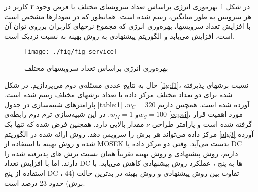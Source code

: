 در شکل \ref{fig:f1a3}
بهره‌وری انرژی براساس تعداد سرویسای مختلف با فرض وجود ۲ کاربر در هر سرویس به طور میانگین، رسم شده است. همانطور که در نمودارها مشخص است با افزایش تعداد سرویسها، بهره‌وری انرژی که مجموع نرخهای کاربران برروی توان آن است، افزایش می‌یابد و الگوریتم پیشنهادی به روش بهینه به نسبت نزدیک است‌.  
\begin{figure}%
	\centering
	\texttt{[image: ./fig/fig\_service]}
	\caption{بهره‌وری انرژی براساس تعداد سرویسهای مختلف }
	\label{fig:f1a3}
\end{figure}


حال به نتایج عددی مسئله‌ی دوم می‌پردازیم.
در شکل \ref{fig:f1}، نسبت برشهای پذیرفته شده برای دو تعداد مختلف مرکز داده با تعداد برشهای مختلف رسم شده است. پارامترهای شبیه‌سازی در جدول \ref{table:1} آورده شده است. همچنین داریم 
 $w_C = 320$،
 $w_S = 100$و 
 $w_M =1$.
 در این شبیه‌سازی ترم دوم رابطه‌ی \eqref{eqpsi}، مورد اهمیت قرار گرفته شده است و پارامتر طراحی $\nu$ مقدار بالایی دارد.
 همچنین فرض شده که تنها یک مرکز داده می‌تواند هر برش را سرویس دهد. روش ارائه شده در الگوریتم  \ref{alg3} آورده شده و روش بهینه با استفاده از MOSEK بدست می‌آید.
 وقتی دو مرکز داده یا DC داریم، روش پیشنهادی و روش بهینه تقریباً همان نسبت برش های پذیرفته شده را دارند. اما با افزایش تعداد DC ها به پنج ، عملکرد روش پیشنهادی کاهش می‌یابد.
 با استفاده از پنج DC ، تفاوت بین روش پیشنهادی و روش بهینه در بدترین حالت (44 برش) حدود 23 درصد است.

